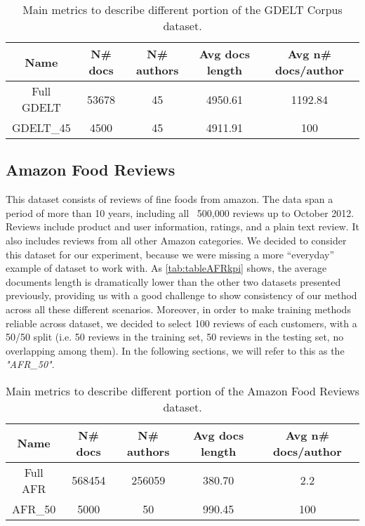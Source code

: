 \begin{table}[h!]
	\begin{center}  
		\caption[GDELT Corpus metrics]{Main metrics to describe different portion of the GDELT Corpus dataset.} 
		\label{tab:tableGDELTkpi}
		\begin{tabular}{|c | c | c | c | c |}
			\hline 
			Name & N\# docs & N\# authors & Avg docs length & Avg n\# docs/author \\
			\hline
			Full GDELT & 53678 & 45 & 4950.61 & 1192.84 \\ \hline
			GDELT\_45 & 4500 & 45 & 4911.91 & 100  \\ \hline
		\end{tabular} 
	\end{center}
\end{table}

\subsection{Amazon Food Reviews}
This dataset consists of reviews of fine foods from amazon. The data span a period of more than 10 years, including all ~500,000 reviews up to October 2012. Reviews include product and user information, ratings, and a plain text review. It also includes reviews from all other Amazon categories.
We decided to consider this dataset for our experiment, because we were missing a more \enquote{everyday} example of dataset to work with. As \autoref{tab:tableAFRkpi} shows, the average documents length is dramatically lower than the other two datasets presented previously, providing us with a good challenge to show consistency of our method across all these different scenarios.
Moreover, in order to make training methods reliable across dataset, we decided to select 100 reviews of each customers, with a 50/50 split (i.e. 50 reviews in the training set, 50 reviews in the testing set, no overlapping among them). In the following sections, we will refer to this as the \textit{"AFR\_50"}.

\begin{table}[h!]
	\begin{center}  
		\caption[Amazon Food Reviews Corpus metrics]{Main metrics to describe different portion of the Amazon Food Reviews dataset.} 
		\label{tab:tableAFRkpi}
		\begin{tabular}{|c | c | c | c | c |}
			\hline 
			Name & N\# docs & N\# authors & Avg docs length & Avg n\# docs/author \\
			\hline
			Full AFR & 568454 & 256059 & 380.70 & 2.2 \\ \hline
			AFR\_50 & 5000 & 50 & 990.45 & 100  \\ \hline
		\end{tabular} 
	\end{center}
\end{table}

